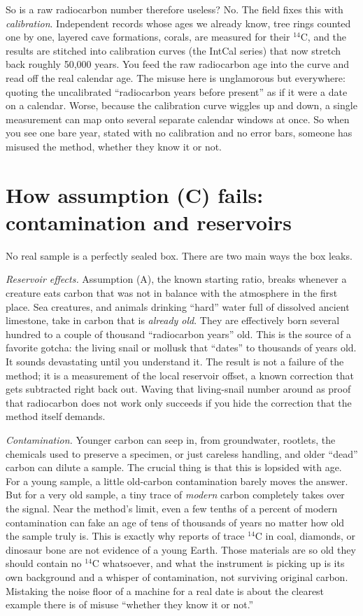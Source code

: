 \documentclass[11pt]{article}
\begin{document}
So is a raw radiocarbon number therefore useless? No. The field fixes this with \emph{calibration}. Independent records whose ages we already know, tree rings counted one by one, layered cave formations, corals, are measured for their $^{14}\mathrm{C}$, and the results are stitched into calibration curves (the IntCal series) that now stretch back roughly 50{,}000 years. You feed the raw radiocarbon age into the curve and read off the real calendar age. The misuse here is unglamorous but everywhere: quoting the uncalibrated ``radiocarbon years before present'' as if it were a date on a calendar. Worse, because the calibration curve wiggles up and down, a single measurement can map onto several separate calendar windows at once. So when you see one bare year, stated with no calibration and no error bars, someone has misused the method, whether they know it or not.

\section*{How assumption (C) fails: contamination and reservoirs}

No real sample is a perfectly sealed box. There are two main ways the box leaks.

\emph{Reservoir effects.} Assumption (A), the known starting ratio, breaks whenever a creature eats carbon that was not in balance with the atmosphere in the first place. Sea creatures, and animals drinking ``hard'' water full of dissolved ancient limestone, take in carbon that is \emph{already old}. They are effectively born several hundred to a couple of thousand ``radiocarbon years'' old. This is the source of a favorite gotcha: the living snail or mollusk that ``dates'' to thousands of years old. It sounds devastating until you understand it. The result is not a failure of the method; it is a measurement of the local reservoir offset, a known correction that gets subtracted right back out. Waving that living-snail number around as proof that radiocarbon does not work only succeeds if you hide the correction that the method itself demands.

\emph{Contamination.} Younger carbon can seep in, from groundwater, rootlets, the chemicals used to preserve a specimen, or just careless handling, and older ``dead'' carbon can dilute a sample. The crucial thing is that this is lopsided with age. For a young sample, a little old-carbon contamination barely moves the answer. But for a very old sample, a tiny trace of \emph{modern} carbon completely takes over the signal. Near the method's limit, even a few tenths of a percent of modern contamination can fake an age of tens of thousands of years no matter how old the sample truly is. This is exactly why reports of trace $^{14}\mathrm{C}$ in coal, diamonds, or dinosaur bone are not evidence of a young Earth. Those materials are so old they should contain no $^{14}\mathrm{C}$ whatsoever, and what the instrument is picking up is its own background and a whisper of contamination, not surviving original carbon. Mistaking the noise floor of a machine for a real date is about the clearest example there is of misuse ``whether they know it or not.''
\end{document}
